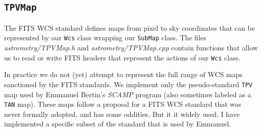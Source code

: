 \documentclass[11pt,preprint,flushrt]{aastex}
\begin{document}
\subsection{{\tt TPVMap}}

The FITS WCS standard defines maps from pixel to sky coordinates that can be represented by our {\tt Wcs} class wrapping our {\tt SubMap} class.  The files {\it astrometry/TPVMap.h} and {\it astrometry/TPVMap.cpp} contain functions that allow us to read or write FITS headers that represent the actions of our {\tt Wcs} class.  

In practice we do not (yet) attempt to represent the full range of WCS maps sanctioned by the FITS standards.  We implement only the pseudo-standard {\tt TPV} map used by Emmanuel Bertin's {\it SCAMP} program (also sometimes labeled as a {\tt TAN} map).
These maps follow a proposal for a FITS WCS standard that was never formally adopted, and has some oddities.  But it it widely used.  I have implemented a specific subset of the standard that is used by Emmanuel.
\end{document}
